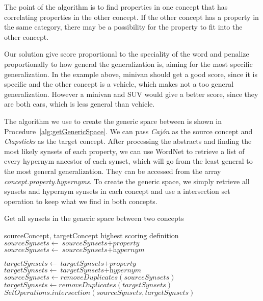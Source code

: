 The point of the algorithm is to find properties in one concept that has correlating properties in the other concept. If the other concept has a property in the same category, there may be a possibility for the property to fit into the other concept.

Our solution give score proportional to the speciality of the word and penalize proportionally to how general the generalization is, aiming for the most specific generalization. In the example above, minivan should get a good score, since it is specific and the other concept is a vehicle, which makes not a too general generalization. However a minivan and SUV would give a better score, since they are both cars, which is less general than vehicle.

The algorithm we use to create the generic space between is shown in Procedure~\ref{alg:getGenericSpace}. We can pass \emph{Cajón} as the source concept and \emph{Clapsticks} as the target concept. After processing the abstracts and finding the most likely synsets of each property, we can use WordNet to retrieve a list of every hypernym ancestor of each synset, which will go from the least general to the most general generalization. They can be accessed from the array \emph{concept.property.hypernyms}. To create the generic space, we simply retrieve all synsets and hypernym synsets in each concept and use a intersection set operation to keep what we find in both concepts.

\begin{algorithm}
	\caption{Get all synsets in the generic space between two concepts}\label{alg:getGenericSpace}
	\begin{algorithmic}[1]
		\Require sourceConcept,
		targetConcept
		\Ensure highest scoring definition
		\State ${\textit{sourceSynsets} \gets {\textit{sourceSynsets} + \textit{property}}}$
		\State ${\textit{sourceSynsets} \gets {\textit{sourceSynsets} + \textit{hypernym}}}$
		\EndFor
		\EndFor
		
		\State ${\textit{targetSynsets} \gets {\textit{targetSynsets} + \textit{property}}}$
		\State ${\textit{targetSynsets} \gets {\textit{targetSynsets} + \textit{hypernym}}}$
		\EndFor
		\EndFor
		\State ${\textit{sourceSynsets} \gets {removeDuplicates(\textit{sourceSynsets})}}$
		\State ${\textit{targetSynsets} \gets {removeDuplicates(\textit{targetSynsets})}}$
		\State \Return ${SetOperations.intersection(\textit{sourceSynsets}, \textit{targetSynsets})}$
		\EndProcedure
	\end{algorithmic}
\end{algorithm}

